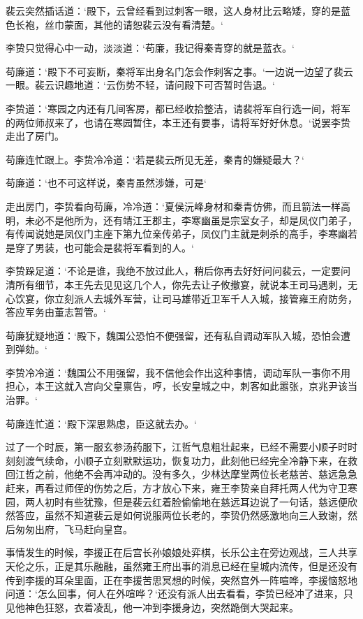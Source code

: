 裴云突然插话道：‘殿下，云曾经看到过刺客一眼，这人身材比云略矮，穿的是蓝色长袍，丝巾蒙面，其他的请恕裴云没有看清楚。‘

李贽只觉得心中一动，淡淡道：‘苟廉，我记得秦青穿的就是蓝衣。‘

苟廉道：‘殿下不可妄断，秦将军出身名门怎会作刺客之事。‘一边说一边望了裴云一眼。裴云识趣地道：‘云伤势不轻，请问殿下可否暂时告退。‘

李贽道：‘寒园之内还有几间客房，都已经收拾整洁，请裴将军自行选一间，将军的两位师叔来了，也请在寒园暂住，本王还有要事，请将军好好休息。‘说罢李贽走出了房门。

苟廉连忙跟上。李贽冷冷道：‘若是裴云所见无差，秦青的嫌疑最大？‘

苟廉道：‘也不可这样说，秦青虽然涉嫌，可是‘

走出房门，李贽看向苟廉，冷冷道：‘夏侯沅峰身材和秦青仿佛，而且箭法一样高明，未必不是他所为，还有靖江王郡主，李寒幽虽是宗室女子，却是凤仪门弟子，有传闻说她是凤仪门主座下第九位亲传弟子，凤仪门主就是刺杀的高手，李寒幽若是穿了男装，也可能会是裴将军看到的人。‘

李贽跺足道：‘不论是谁，我绝不放过此人，稍后你再去好好问问裴云，一定要问清所有细节，本王先去见见这几个人，你先去让子攸撤宴，就说本王司马遇刺，无心饮宴，你立刻派人去城外军营，让司马雄带近卫军千人入城，接管雍王府防务，答应军务由董志暂管。‘

苟廉犹疑地道：‘殿下，魏国公恐怕不便强留，还有私自调动军队入城，恐怕会遭到弹劾。‘

李贽冷冷道：‘魏国公不用强留，我不信他会作出这种事情，调动军队一事你不用担心，本王这就入宫向父皇禀告，哼，长安皇城之中，刺客如此嚣张，京兆尹该当治罪。‘

苟廉连忙道：‘殿下深思熟虑，臣这就去办。‘

过了一个时辰，第一服玄参汤药服下，江哲气息粗壮起来，已经不需要小顺子时时刻刻渡气续命，小顺子立刻默默运功，恢复功力，此刻他已经完全冷静下来，在救回江哲之前，他绝不会再冲动的。没有多久，少林达摩堂两位长老慈苦、慈远急急赶来，再看过师侄的伤势之后，方才放心下来，雍王李贽亲自拜托两人代为守卫寒园，两人初时有些犹豫，但是裴云红着脸偷偷地在慈远耳边说了一句话，慈远便欣然答应，虽然不知道裴云是如何说服两位长老的，李贽仍然感激地向三人致谢，然后匆匆出府，飞马赶向皇宫。

事情发生的时候，李援正在后宫长孙娘娘处弈棋，长乐公主在旁边观战，三人共享天伦之乐，正是其乐融融，虽然雍王府出事的消息已经在皇城内流传，但是还没有传到李援的耳朵里面，正在李援苦思冥想的时候，突然宫外一阵喧哗，李援恼怒地问道：‘怎么回事，何人在外喧哗？‘还没有派人出去看看，李贽已经冲了进来，只见他神色狂怒，衣着凌乱，他一冲到李援身边，突然跪倒大哭起来。

